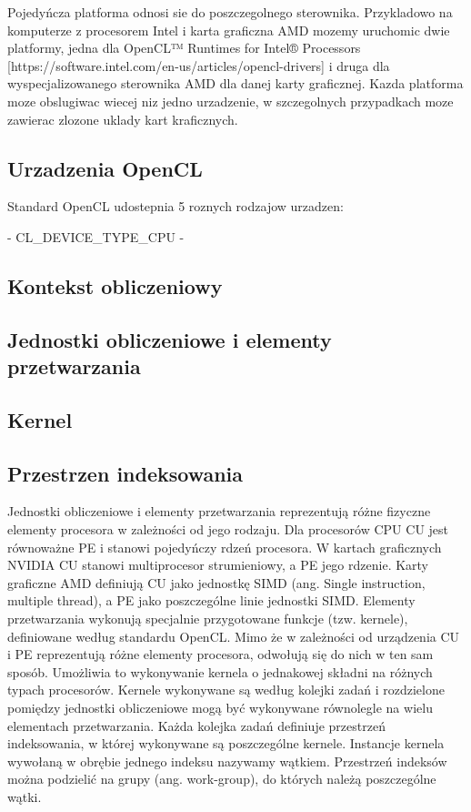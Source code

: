 Pojedyńcza platforma odnosi sie do poszczegolnego sterownika. Przykladowo na komputerze z procesorem Intel i karta graficzna AMD mozemy uruchomic dwie platformy, jedna dla OpenCL™ Runtimes for Intel® Processors [https://software.intel.com/en-us/articles/opencl-drivers] i druga dla wyspecjalizowanego sterownika AMD dla danej karty graficznej. Kazda platforma moze obslugiwac wiecej niz jedno urzadzenie, w szczegolnych przypadkach moze zawierac zlozone uklady kart kraficznych.

\subsection{Urzadzenia OpenCL}\label{sec:OpenC21L}

Standard OpenCL udostepnia 5 roznych rodzajow urzadzen:

- CL_DEVICE_TYPE_CPU - 

\subsection{Kontekst obliczeniowy}\label{sec:OpenC2L}


\subsection{Jednostki obliczeniowe i elementy przetwarzania}\label{sec:OpenC3L}
\subsection{Kernel}\label{sec:OpenC4L}
\subsection{Przestrzen indeksowania}\label{sec:OpenC5L}
Jednostki obliczeniowe i elementy przetwarzania reprezentują różne fizyczne elementy procesora w zależności od jego rodzaju. Dla procesorów CPU CU jest równoważne PE i stanowi pojedyńczy rdzeń procesora. W kartach graficznych NVIDIA CU stanowi multiprocesor strumieniowy, a PE jego rdzenie. Karty graficzne AMD definiują CU jako jednostkę SIMD (ang. Single instruction, multiple thread), a PE jako poszczególne linie jednostki SIMD. Elementy przetwarzania wykonują specjalnie przygotowane funkcje (tzw. kernele), definiowane według standardu OpenCL. Mimo że w zależności od urządzenia CU i PE reprezentują różne elementy procesora, odwołują się do nich w ten sam sposób. Umożliwia to wykonywanie  kernela o jednakowej składni na różnych typach procesorów. Kernele wykonywane są według kolejki zadań i rozdzielone pomiędzy jednostki obliczeniowe mogą być wykonywane równolegle na wielu elementach przetwarzania. Każda kolejka zadań definiuje przestrzeń indeksowania, w której wykonywane są poszczególne kernele.  Instancje kernela wywołaną w obrębie jednego indeksu nazywamy wątkiem. Przestrzeń indeksów można podzielić na grupy (ang. work-group), do których należą poszczególne wątki.

